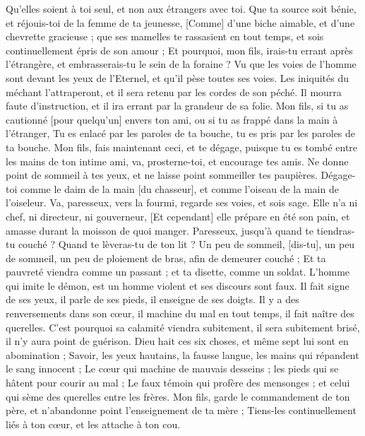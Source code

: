 \begin{multicols}{2}
Qu'elles soient à toi seul, et non aux étrangers avec toi.
Que ta source soit bénie, et réjouis-toi de la femme de ta jeunesse,
[Comme] d'une biche aimable, et d'une chevrette gracieuse ; que ses mamelles te rassasient en tout temps, et sois continuellement épris de son amour ;
Et pourquoi, mon fils, irais-tu errant après l'étrangère, et embrasserais-tu le sein de la foraine ?
Vu que les voies de l'homme sont devant les yeux de l'Eternel, et qu'il pèse toutes ses voies.
Les iniquités du méchant l'attraperont, et il sera retenu par les cordes de son péché.
Il mourra faute d'instruction, et il ira errant par la grandeur de sa folie.
\VerseOne{}Mon fils, si tu as cautionné [pour quelqu'un] envers ton ami, ou si tu as frappé dans la main à l'étranger,
Tu es enlacé par les paroles de ta bouche, tu es pris par les paroles de ta bouche.
Mon fils, fais maintenant ceci, et te dégage, puisque tu es tombé entre les mains de ton intime ami, va, prosterne-toi, et encourage tes amis.
Ne donne point de sommeil à tes yeux, et ne laisse point sommeiller tes paupières.
Dégage-toi comme le daim de la main [du chasseur], et comme l'oiseau de la main de l'oiseleur.
Va, paresseux, vers la fourmi, regarde ses voies, et sois sage.
Elle n'a ni chef, ni directeur, ni gouverneur,
[Et cependant] elle prépare en été son pain, et amasse durant la moisson de quoi manger.
Paresseux, jusqu'à quand te tiendras-tu couché ? Quand te lèveras-tu de ton lit ?
Un peu de sommeil, [dis-tu], un peu de sommeil, un peu de ploiement de bras, afin de demeurer couché ;
Et ta pauvreté viendra comme un passant ; et ta disette, comme un soldat.
L'homme qui imite le démon, est un homme violent et ses discours sont faux.
Il fait signe de ses yeux, il parle de ses pieds, il enseigne de ses doigts.
Il y a des renversements dans son cœur, il machine du mal en tout temps, il fait naître des querelles.
C'est pourquoi sa calamité viendra subitement, il sera subitement brisé, il n'y aura point de guérison.
Dieu hait ces six choses, et même sept lui sont en abomination ;
Savoir, les yeux hautains, la fausse langue, les mains qui répandent le sang innocent ;
Le cœur qui machine de mauvais desseins ; les pieds qui se hâtent pour courir au mal ;
Le faux témoin qui profère des mensonges ; et celui qui sème des querelles entre les frères.
Mon fils, garde le commandement de ton père, et n'abandonne point l'enseignement de ta mère ;
Tiens-les continuellement liés à ton cœur, et les attache à ton cou.

\end{multicols}
